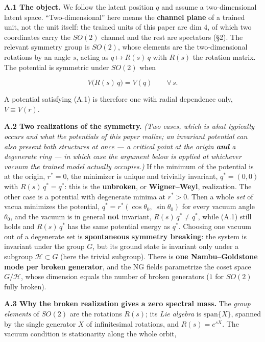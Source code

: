 \documentclass[10pt]{article}
\begin{document}
\textbf{A.1 The object.} We follow the latent position $q$ and assume a two-dimensional latent space. ``Two-dimensional'' here means the \textbf{channel plane} of a trained unit, not the unit itself: the trained units of this paper are dim $4$, of which two coordinates carry the $SO(2)$ channel and the rest are spectators (\S2). The relevant symmetry group is $SO(2)$, whose elements are the two-dimensional rotations by an angle $s$, acting as $q\mapsto R(s)\,q$ with $R(s)$ the rotation matrix. The potential is symmetric under $SO(2)$ when

\begin{equation}
V\big(R(s)\,q\big)=V(q)\qquad\forall\,s.
\end{equation}

A potential satisfying (A.1) is therefore one with radial dependence only, $V\equiv V(r)$.

\textbf{A.2 Two realizations of the symmetry.} \emph{(Two cases, which is what typically occurs and what the potentials of this paper realize; an invariant potential can also present both structures at once --- a critical point at the origin \textbf{and} a degenerate ring --- in which case the argument below is applied at whichever vacuum the trained model actually occupies.)} If the minimum of the potential is at the origin, $r^*=0$, the minimizer is unique and trivially invariant, $q^*=(0,0)$ with $R(s)\,q^*=q^*$: this is the \textbf{unbroken}, or \textbf{Wigner--Weyl}, realization. The other case is a potential with degenerate minima at $r^*>0$. Then a whole \emph{set} of vacua minimizes the potential, $q^*=r^*(\cos\theta_0,\ \sin\theta_0)$ for every vacuum angle $\theta_0$, and the vacuum is in general \textbf{not} invariant, $R(s)\,q^*\neq q^*$, while (A.1) still holds and $R(s)\,q^*$ has the same potential energy as $q^*$. Choosing one vacuum out of a degenerate set is \textbf{spontaneous symmetry breaking}: the system is invariant under the group $G$, but its ground state is invariant only under a subgroup $\mathcal H\subset G$ (here the trivial subgroup). There is \textbf{one Nambu--Goldstone mode per broken generator}, and the NG fields parametrize the coset space $G/\mathcal H$, whose dimension equals the number of broken generators ($1$ for $SO(2)$ fully broken).

\textbf{A.3 Why the broken realization gives a zero spectral mass.} The \emph{group elements} of $SO(2)$ are the rotations $R(s)$; its \emph{Lie algebra} is $\mathrm{span}\{X\}$, spanned by the single generator $X$ of infinitesimal rotations, and $R(s)=e^{sX}$. The vacuum condition is stationarity along the whole orbit,
\end{document}
